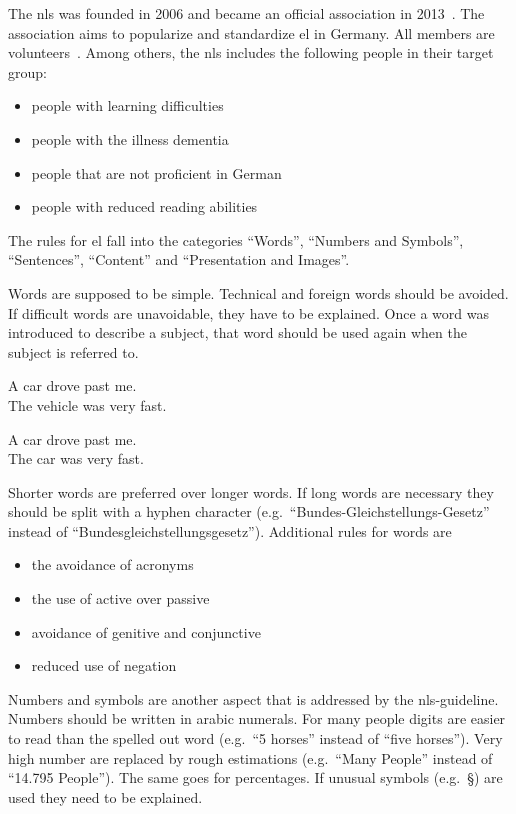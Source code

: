 The \gls{nls} was founded in 2006 and became an official association in 2013~\autocite{netzwerkHistory}.
The association aims to popularize and standardize \gls{el} in Germany.
All members are volunteers~\autocite{netzwerkGoals}.
Among others, the \gls{nls} includes the following people in their target group:
\begin{itemize}[noitemsep]
    \item people with learning difficulties
    \item people with the illness dementia
    \item people that are not proficient in German
    \item people with reduced reading abilities
\end{itemize}
The rules for \gls{el} fall into the categories \enquote{Words}, \enquote{Numbers and Symbols}, \enquote{Sentences}, \enquote{Content} and \enquote{Presentation and Images}.

Words are supposed to be simple.
Technical and foreign words should be avoided.
If difficult words are unavoidable, they have to be explained.
Once a word was introduced to describe a subject, that word should be used again when the subject is referred to.

\begin{center}
    \colorbox{red!20}{
        \begin{minipage}{0.6\textwidth}
           A car drove past me.\\
           The vehicle was very fast.
        \end{minipage}
    }
    \colorbox{green!20}{
        \begin{minipage}{0.6\textwidth}
            A car drove past me.\\
            The car was very fast.
        \end{minipage}
    }
\end{center}
Shorter words are preferred over longer words.
If long words are necessary they should be split with a hyphen character (e.g.\ \enquote{Bundes-Gleichstellungs-Gesetz} instead of \enquote{Bundesgleichstellungsgesetz}).
Additional rules for words are
\begin{itemize}[noitemsep]
    \item the avoidance of acronyms
    \item the use of active over passive
    \item avoidance of genitive and conjunctive
    \item reduced use of negation
\end{itemize}
Numbers and symbols are another aspect that is addressed by the \gls{nls}-guideline.
Numbers should be written in arabic numerals.
For many people digits are easier to read than the spelled out word (e.g.\ \enquote{5 horses} instead of \enquote{five horses}).
Very high number are replaced by rough estimations (e.g.\ \enquote{Many People} instead of \enquote{14.795 People}).
The same goes for percentages.
If unusual symbols (e.g.\ §) are used they need to be explained.

